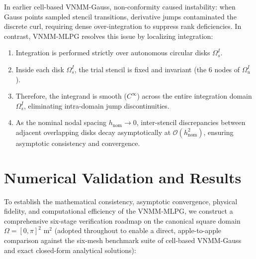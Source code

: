\documentclass[preprint,12pt]{elsarticle}
\begin{document}
In earlier cell-based VNMM-Gauss, non-conformity caused instability: when Gauss points sampled stencil transitions, derivative jumps contaminated the discrete curl, requiring dense over-integration to suppress rank deficiencies. In contrast, VNMM-MLPG resolves this issue by localizing integration:
\begin{enumerate}
    \item Integration is performed strictly over autonomous circular disks $\Omega_s^I$.
    \item Inside each disk $\Omega_s^I$, the trial stencil is fixed and invariant (the 6 nodes of $\Omega_u^I$).
    \item Therefore, the integrand is smooth ($C^\infty$) across the entire integration domain $\Omega_s^I$, eliminating intra-domain jump discontinuities.
    \item As the nominal nodal spacing $h_{\mathrm{nom}} \to 0$, inter-stencil discrepancies between adjacent overlapping disks decay asymptotically at $\mathcal{O}(h_{\mathrm{nom}}^2)$, ensuring asymptotic consistency and convergence.
\end{enumerate}

\section{Numerical Validation and Results}
\label{sec:results}

To establish the mathematical consistency, asymptotic convergence, physical fidelity, and computational efficiency of the VNMM-MLPG, we construct a comprehensive six-stage verification roadmap on the canonical square domain $\Omega = [0, \pi]^2\text{ m}^2$ (adopted throughout to enable a direct, apple-to-apple comparison against the six-mesh benchmark suite of cell-based VNMM-Gauss \cite{stable_vnmm2d_2026} and exact closed-form analytical solutions):
\end{document}

